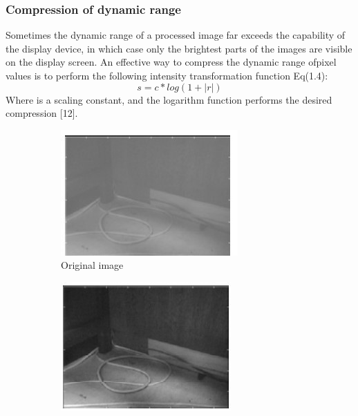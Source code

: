 \subsubsection{Compression of dynamic range}
Sometimes the dynamic range of a processed image far exceeds the capability of the display device,
in which case only the brightest parts of the images are visible on the display screen.
An effective way to compress the dynamic range ofpixel values is to perform the following intensity transformation function Eq(1.4):
        \begin{equation}
                s = c * log(1+|r|)
        \end{equation}
Where is a scaling constant, and the logarithm function performs the desired compression [12].

        \begin{figure}[h]
                \centering
                \begin{subfigure}[b]{0.46\textwidth}
                        \centering
                        \includegraphics[width=\textwidth]{chapiter1/figures/constrat-ori.jpg}
                        \caption{Original image}
                \end{subfigure}
                \hfill
                \begin{subfigure}[b]{0.46\textwidth}
                        \centering
                        \includegraphics[width=\textwidth]{chapiter1/figures/constart-processed.jpg}

\end{subfigure}
\end{figure}
